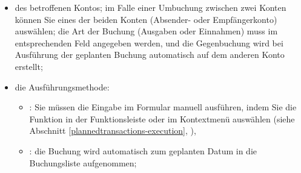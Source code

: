 \begin{itemize}
	\item des betroffenen Kontos; im Falle einer Umbuchung zwischen zwei Konten können Sie eines der beiden Konten (Absender- oder Empfängerkonto) auswählen; die Art der Buchung (Ausgaben oder Einnahmen) muss im entsprechenden Feld angegeben werden, und die Gegenbuchung wird bei Ausführung der geplanten Buchung automatisch auf dem anderen Konto erstellt;
	\item die Ausführungsmethode:
	\begin{itemize}
		\item {}: Sie müssen die Eingabe im Formular manuell ausführen, indem Sie die Funktion  in der Funktionsleiste oder im Kontextmenü auswählen (siehe Abschnitt \vref{plannedtransactions-execution}, ),
		\item {}: die Buchung wird automatisch zum geplanten Datum in die Buchungsliste aufgenommen;

\end{itemize}
\end{itemize}
